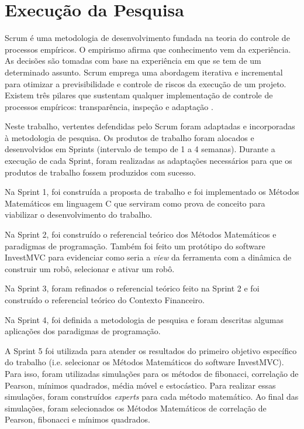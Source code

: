 \section{Execução da Pesquisa}

Scrum é uma metodologia de desenvolvimento fundada na teoria do controle de processos empíricos. O empirismo afirma que conhecimento vem da experiência. As decisões são tomadas com base na experiência em que se tem de um determinado assunto. Scrum emprega uma abordagem iterativa e incremental para otimizar a previsibilidade e controle de riscos da execução de um projeto. Existem três pilares que sustentam qualquer implementação de controle de processos empíricos: transparência, inspeção e adaptação \cite[pág.~4]{schwaber2013}.

Neste trabalho, vertentes defendidas pelo Scrum foram adaptadas e incorporadas à metodologia de pesquisa. Os produtos de  trabalho foram alocados e desenvolvidos em Sprints (intervalo de tempo de 1 a 4 semanas). Durante a execução de cada Sprint, foram realizadas as adaptações necessários para que os produtos de trabalho fossem produzidos com sucesso.

Na Sprint 1, foi construída a proposta de trabalho e foi implementado os Métodos Matemáticos em linguagem C que serviram como prova de conceito para viabilizar o desenvolvimento do trabalho.

Na Sprint 2, foi construído o referencial teórico dos Métodos Matemáticos e paradigmas de programação. Também foi feito um protótipo do software InvestMVC para evidenciar como seria a \textit{view} da ferramenta com a dinâmica de construir um robô, selecionar e ativar um robô.

Na Sprint 3, foram refinados o referencial teórico feito na Sprint 2 e foi construído o referencial teórico do Contexto Financeiro.

Na Sprint 4, foi definida a metodologia de pesquisa e foram descritas algumas aplicações dos paradigmas de programação.

A Sprint 5 foi utilizada para atender os resultados do primeiro objetivo específico do trabalho (i.e. selecionar os Métodos Matemáticos do software InvestMVC). Para isso, foram utilizadas simulações para os métodos de fibonacci, correlação de Pearson, mínimos quadrados, média móvel e estocástico. Para realizar essas simulações, foram construídos \textit{experts} para cada método matemático. Ao final das simulações, foram selecionados os Métodos Matemáticos de correlação de Pearson, fibonacci e mínimos quadrados.

